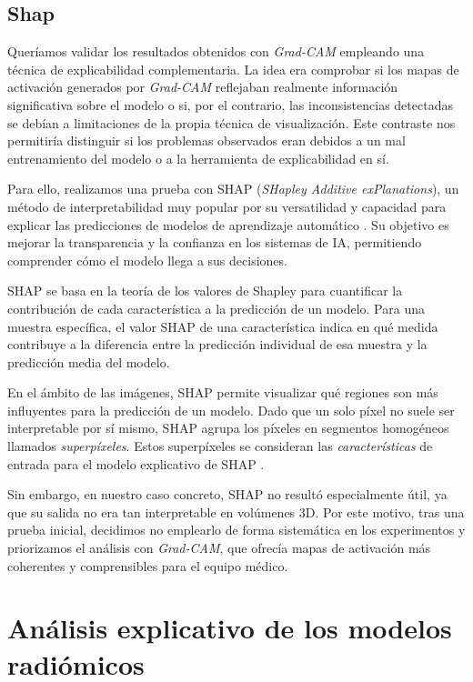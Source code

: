 \subsection{Shap}
Queríamos validar los resultados obtenidos con \textit{Grad-CAM} empleando una técnica de explicabilidad complementaria. La idea era comprobar si los mapas de activación generados por \textit{Grad-CAM} reflejaban realmente información significativa sobre el modelo o si, por el contrario, las inconsistencias detectadas se debían a limitaciones de la propia técnica de visualización. Este contraste nos permitiría distinguir si los problemas observados eran debidos a un mal entrenamiento del modelo o a la herramienta de explicabilidad en sí.

Para ello, realizamos una prueba con SHAP (\textit{SHapley Additive exPlanations}), un método de interpretabilidad muy popular por su versatilidad y capacidad para explicar las predicciones de modelos de aprendizaje automático \parencite{ponce2024practical}. Su objetivo es mejorar la transparencia y la confianza en los sistemas de IA, permitiendo comprender cómo el modelo llega a sus decisiones.

SHAP se basa en la teoría de los valores de Shapley para cuantificar la contribución de cada característica a la predicción de un modelo. Para una muestra específica, el valor SHAP de una característica indica en qué medida contribuye a la diferencia entre la predicción individual de esa muestra y la predicción media del modelo.

En el ámbito de las imágenes, SHAP permite visualizar qué regiones son más influyentes para la predicción de un modelo. Dado que un solo píxel no suele ser interpretable por sí mismo, SHAP agrupa los píxeles en segmentos homogéneos llamados \textit{superpíxeles}. Estos superpíxeles se consideran las \textit{características} de entrada para el modelo explicativo de SHAP \parencite{dewi2023xai}.

Sin embargo, en nuestro caso concreto, SHAP no resultó especialmente útil, ya que su salida no era tan interpretable en volúmenes 3D. Por este motivo, tras una prueba inicial, decidimos no emplearlo de forma sistemática en los experimentos y priorizamos el análisis con \textit{Grad-CAM}, que ofrecía mapas de activación más coherentes y comprensibles para el equipo médico.


\section{Análisis explicativo de los modelos radiómicos}

